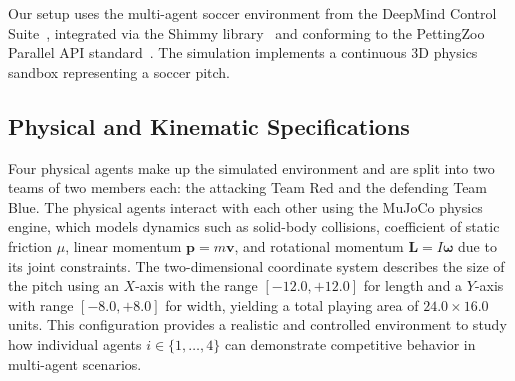 Our setup uses the multi-agent soccer environment from the DeepMind Control Suite~\citep{tassa2020dmcontrol}, integrated via the Shimmy library~\citep{shimmy2022} and conforming to the PettingZoo Parallel API standard~\citep{terry2021pettingzoo}. The simulation implements a continuous 3D physics sandbox representing a soccer pitch.

\subsection{Physical and Kinematic Specifications}
Four physical agents make up the simulated environment and are split into two teams of two members each: the attacking Team Red and the defending Team Blue. The physical agents interact with each other using the MuJoCo physics engine, which models dynamics such as solid-body collisions, coefficient of static friction $\mu$, linear momentum $\mathbf{p} = m\mathbf{v}$, and rotational momentum $\mathbf{L} = I\boldsymbol{\omega}$ due to its joint constraints. The two-dimensional coordinate system describes the size of the pitch using an $X$-axis with the range $[-12.0, +12.0]$ for length and a $Y$-axis with range $[-8.0, +8.0]$ for width, yielding a total playing area of $24.0 \times 16.0$ units. This configuration provides a realistic and controlled environment to study how individual agents $i \in \{1, \dots, 4\}$ can demonstrate competitive behavior in multi-agent scenarios.

